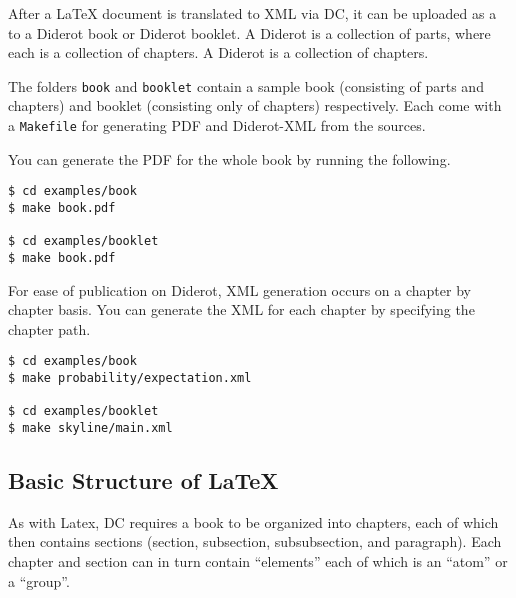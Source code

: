 \begin{definition}
After a LaTeX document is translated to XML via DC, it can be uploaded as a  to a Diderot book or Diderot booklet.  
%
A Diderot  is a collection of parts, where each  is a collection of chapters.
%
A Diderot  is a collection of chapters. 
\end{definition}

\begin{example}
The folders \lstinline`book` and \lstinline`booklet` contain a sample book (consisting of parts and chapters) and booklet (consisting only of chapters) respectively.
%
Each come with a  \lstinline`Makefile` for generating PDF and Diderot-XML from the sources. 
\end{example}

\begin{example}
You can generate the PDF for the whole book by running the following.
%
\begin{lstlisting}
$ cd examples/book
$ make book.pdf

$ cd examples/booklet
$ make book.pdf
\end{lstlisting}
\end{example}

\begin{example}
For ease of publication on Diderot, XML generation occurs on a chapter by chapter basis.
%
You can generate the XML for  each chapter by specifying the chapter path.
\begin{lstlisting}
$ cd examples/book
$ make probability/expectation.xml

$ cd examples/booklet
$ make skyline/main.xml
\end{lstlisting}
\end{example}


\subsection{Basic Structure of LaTeX} 

As with Latex, DC requires a book to be organized into chapters, each of which then contains sections (section, subsection, subsubsection, and paragraph).  Each chapter and section can in turn contain ``elements'' each of which is an ``atom'' or a  ``group''.


